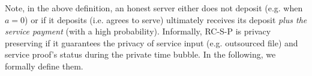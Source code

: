 % 
 Note, in the above definition, an honest server either does not deposit (e.g. when $a=0$) or if it deposits (i.e. agrees to serve) ultimately receives its deposit \emph{plus the service payment} (with a high probability). Informally, RC-S-P is privacy preserving if it guarantees the privacy of service input (e.g. outsourced file) and service proof's status during the private time bubble. In the following, we formally define them.
 

